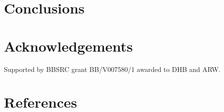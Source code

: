 \documentclass[
]{article}
\begin{document}
\hypertarget{conclusions}{%
\section{Conclusions}\label{conclusions}}

\hypertarget{acknowledgements}{%
\section{Acknowledgements}\label{acknowledgements}}

Supported by BBSRC grant BB/V007580/1 awarded to DHB and ARW.

\hypertarget{references}{%
\section{References}\label{references}}
\end{document}
